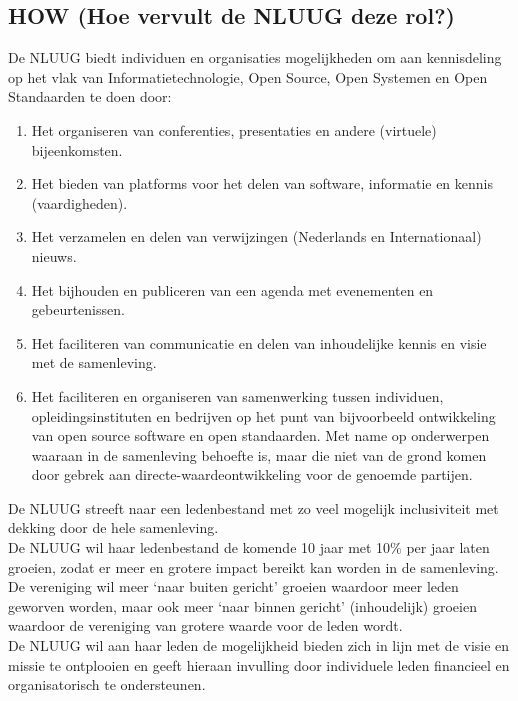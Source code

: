 \documentclass{article}
\begin{document}
\subsection{HOW (Hoe vervult de NLUUG deze rol?)}
De NLUUG biedt individuen en organisaties mogelijkheden om aan kennisdeling op het vlak van Informatietechnologie, Open Source, Open Systemen en Open Standaarden te doen door:
\begin{enumerate}
    \item Het organiseren van conferenties, presentaties en andere (virtuele) bijeenkomsten.
    \item Het bieden van platforms voor het delen van software, informatie en kennis (vaardigheden).
    \item Het verzamelen en delen van verwijzingen (Nederlands en Internationaal) nieuws.
    \item Het bijhouden en publiceren van een agenda met evenementen en gebeurtenissen.
    \item Het faciliteren van communicatie en delen van inhoudelijke kennis en visie met de samenleving.
    \item Het faciliteren en organiseren van samenwerking tussen individuen, opleidingsinstituten en bedrijven op het punt van bijvoorbeeld ontwikkeling van open source software en open standaarden. Met name op onderwerpen waaraan in de samenleving behoefte is, maar die niet van de grond komen door gebrek aan directe-waardeontwikkeling voor de genoemde partijen.
\end{enumerate}

De NLUUG streeft naar een ledenbestand met zo veel mogelijk inclusiviteit met dekking door de hele samenleving. \\

De NLUUG wil haar ledenbestand de komende 10 jaar met 10\% per jaar laten groeien, zodat er meer en grotere impact bereikt kan worden in de samenleving. De vereniging wil meer `naar buiten gericht' groeien waardoor meer leden geworven worden, maar ook meer `naar binnen gericht' (inhoudelijk) groeien waardoor de vereniging van grotere waarde voor de leden wordt. \\

De NLUUG wil aan haar leden de mogelijkheid bieden zich in lijn met de visie en missie te ontplooien en geeft hieraan invulling door individuele leden financieel en organisatorisch te ondersteunen. \\
\end{document}
